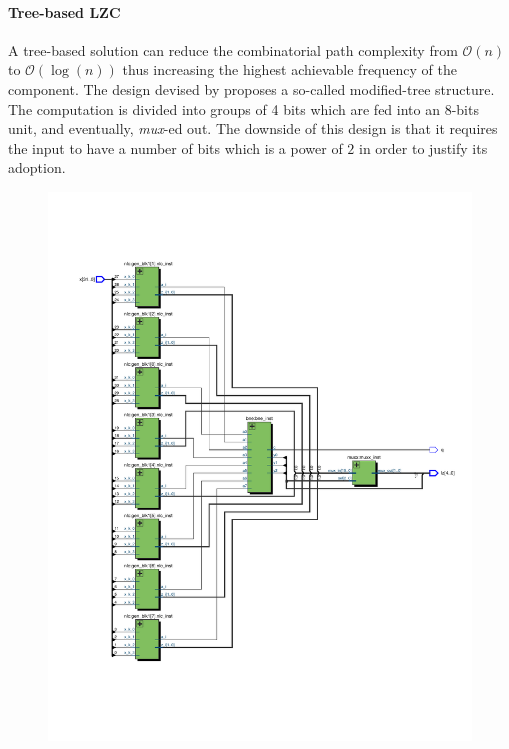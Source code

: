 \paragraph{Tree-based LZC}
A tree-based solution can reduce the combinatorial path complexity from $\mathcal{O}(n)$ to $\mathcal{O}(\log(n))$ thus increasing the highest achievable frequency of the component.
The design devised by \cite{milenkovic_modular_2015} proposes a so-called modified-tree structure. The computation is divided into groups of 4 bits which are fed into an 8-bits unit, and eventually, \textit{mux}-ed out.
The downside of this design is that it requires the input to have a number of bits which is a power of $2$ in order to justify its adoption.
\begin{figure}
        \centering
        \includegraphics[width=\textwidth]{figures/milenkovic_quartus1.pdf}
\end{figure}
